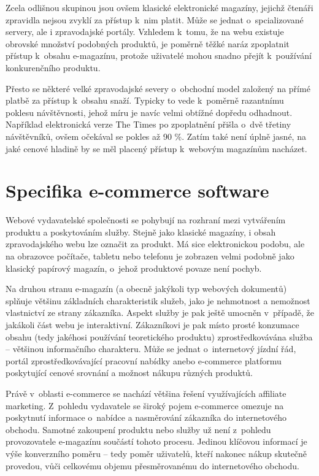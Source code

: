 \documentclass[12pt,oneside,openany]{fithesis}
\makeatletter
\def\cleardoublepage{\clearpage\if@twoside \ifodd\c@page\else
        \thispagestyle{empty}
        \hbox{}\newpage\if@twocolumn\hbox{}\newpage\fi\fi\fi}
\makeatother
\begin{document}
Zcela odlišnou skupinou jsou ovšem klasické elektronické magazíny, 
jejichž čtenáři zpravidla nejsou zvyklí za přístup k~nim platit. Může 
se jednat o~spcializované servery, ale i zpravodajské portály. Vzhledem 
k~tomu, že na webu existuje obrovské množství podobných produktů, je 
poměrně těžké naráz zpoplatnit přístup k~obsahu e-magazínu, protože 
uživatelé mohou snadno přejít k~používání konkurenčního produktu.

Přesto se některé velké zpravodajské severy o~obchodní model založený 
na přímé platbě za přístup k~obsahu snaží. Typicky to vede k~poměrně 
razantnímu poklesu návštěvnosti, jehož míru je navíc velmi obtížné 
dopředu odhadnout. Například elektronická verze The Times po zpoplatnění 
přišla o~dvě třetiny návštěvníků, ovšem očekával se pokles až 90 
\%. \cite{times-reuters}{} Zatím také není úplně jasné, na jaké cenové 
hladině by se měl placený přístup k~webovým magazínům nacházet.

\cleardoublepage\chapter{Specifika e-commerce software}
\label{chap-ecom-soft}\hypertarget{chap-ecom-soft}{}%

Webové vydavatelské společnosti se pohybují na rozhraní mezi vytvářením 
produktu a poskytováním služby. Stejně jako klasické magazíny, i obsah 
zpravodajského webu lze označit za produkt. Má sice elektronickou podobu, 
ale na obrazovce počítače, tabletu nebo telefonu je zobrazen velmi podobně 
jako klasický papírový magazín, o~jehož produktové povaze není pochyb.

Na druhou stranu e-magazín (a obecně jakýkoli typ webových dokumentů) 
splňuje většinu základních charakteristik služeb, jako je nehmotnost a 
nemožnost vlastnictví ze strany zákazníka. Aspekt služby je pak ještě 
umocněn v~případě, že jakákoli část webu je interaktivní. 
Zákazníkovi je pak místo prosté konzumace obsahu (tedy jakéhosi 
používání teoretického produktu) zprostředkovávána služba -- 
většinou informačního charakteru. Může se jednat o~internetový jízdní 
řád, portál zprostředkovávající pracovní nabídky anebo e-commerce 
platformu poskytující cenové srovnání a možnost nákupu různých 
produktů.

Právě v~oblasti e-commerce se nachází většina řešení využívajících 
affiliate marketing. Z~pohledu vydavatele se široký pojem e-commerce omezuje 
na poskytnutí informace o~nabídce a nasměrování zákazníka do 
internetového obchodu. Samotné zakoupení produktu nebo služby už není 
z~pohledu provozovatele e-magazínu součástí tohoto procesu. Jedinou 
klíčovou informací je výše konverzního poměru -- tedy poměr 
uživatelů, kteří nakonec nákup skutečně provedou, vůči celkovému 
objemu přesměrovanému do internetového obchodu.
\end{document}
